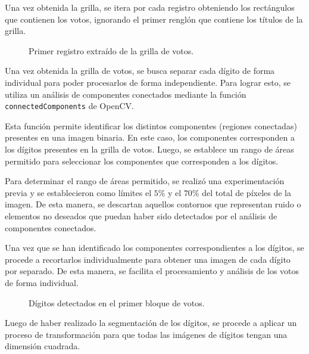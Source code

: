 Una vez obtenida la grilla, se itera por cada registro obteniendo los rectángulos que contienen los votos, ignorando el
primer renglón que contiene los títulos de la grilla.

\begin{figure}[H]
    \centering
    \caption{Primer registro extraído de la grilla de votos.}
    \label{fig:etl-4-registro}
\end{figure}

Una vez obtenida la grilla de votos, se busca separar cada dígito de forma individual para poder procesarlos de forma
independiente. Para lograr esto, se utiliza un análisis de componentes conectados mediante la función
\verb|connectedComponents| de OpenCV.

Esta función permite identificar los distintos componentes (regiones conectadas) presentes en una imagen binaria. En
este caso, los componentes corresponden a los dígitos presentes en la grilla de votos. Luego, se establece un rango de
áreas permitido para seleccionar los componentes que corresponden a los dígitos.

Para determinar el rango de áreas permitido, se realizó una experimentación previa y se establecieron como límites el
$5\%$ y el $70\%$ del total de píxeles de la imagen. De esta manera, se descartan aquellos contornos que representan
ruido o elementos no deseados que puedan haber sido detectados por el análisis de componentes conectados.

Una vez que se han identificado los componentes correspondientes a los dígitos, se procede a recortarlos
individualmente para obtener una imagen de cada dígito por separado. De esta manera, se facilita el procesamiento y
análisis de los votos de forma individual.

\begin{figure}[H]
    \centering
    \caption{Dígitos detectados en el primer bloque de votos.}
    \label{fig:etl-4-digitos}
\end{figure}

Luego de haber realizado la segmentación de los dígitos, se procede a aplicar un proceso de transformación para que
todas las imágenes de dígitos tengan una dimensión cuadrada.

